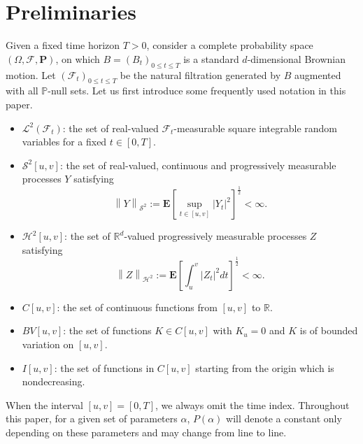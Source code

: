 \documentclass[10pt]{article}%
\numberwithin{equation}{section}
\begin{document}
\section{Preliminaries}
Given a fixed time horizon $T>0$, consider a complete probability space  $(\Omega, \mathcal{F}, \mathbf{P})$, on which $B=(B_t)_{0\leq t\leq T}$ is a standard $d$-dimensional Brownian motion. Let $(\mathcal{F}_t)_{0\leq t\leq T}$ be the natural filtration generated by $B$ augmented with all $\mathbb{P}$-null sets. Let us first introduce some frequently used notation in this paper. %
\begin{itemize}
    \item $\mathcal{L}^2(\mathcal{F}_t)$: the set of real-valued $\mathcal{F}_t$-measurable square integrable random variables for a fixed $t\in[0,T]$.
    \item $\mathcal{S}^2[u,v]$: the set of real-valued, continuous and progressively measurable processes $Y$ satisfying 
    $$\left \|Y  \right \|_{\mathcal{S}^2}:=\mathbf{E}\left[\sup_{t\in[u,v]}\left|Y_t\right|^{2}\right]^{\frac{1}{2}}<\infty.$$
    \item$\mathcal{H}^2[u,v]$: the set of $\mathbb{R}^d$-valued progressively measurable processes $Z$ satisfying 
    $$\left \|Z  \right \|_{\mathcal{H}^2}:=\mathbf{E}\left[\int_{u}^{v}\left|Z_t\right|^{2}dt\right]^{\frac{1}{2}}<\infty.$$
    
    \item $C\left[u,v\right]$: the set of continuous functions from $\left[u,v\right]$ to $\mathbb{R}$.

	\item  $BV\left[u,v\right]$: the set of functions $K\in C\left[u,v\right]$ with $K_u=0$ and $K$ is of bounded variation on $\left[u,v\right]$.
	
	\item  $I\left[u,v\right]$: the set of functions in $C\left[u,v\right]$ starting from the origin which is nondecreasing.
\end{itemize}
When the interval $[u,v]=[0,T]$, we always omit the time index. Throughout this paper, for a given set of parameters $\alpha$, $P(\alpha )$ will denote a constant only depending on these parameters and may change from line to line.
\end{document}
